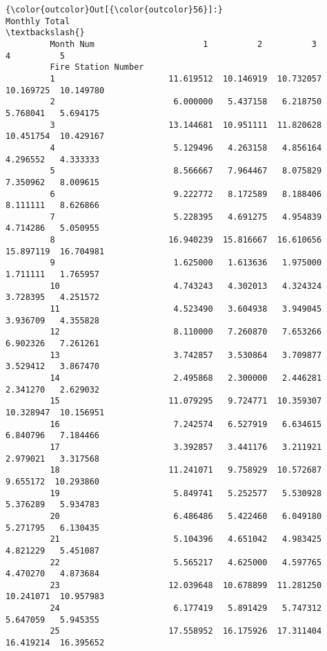 \documentclass[11pt]{article}
\begin{document}
\begin{Verbatim}[commandchars=\\\{\}]
{\color{outcolor}Out[{\color{outcolor}56}]:}                     Monthly Total                                              \textbackslash{}
         Month Num                      1          2          3          4          5    
         Fire Station Number                                                             
         1                       11.619512  10.146919  10.732057  10.169725  10.149780   
         2                        6.000000   5.437158   6.218750   5.768041   5.694175   
         3                       13.144681  10.951111  11.820628  10.451754  10.429167   
         4                        5.129496   4.263158   4.856164   4.296552   4.333333   
         5                        8.566667   7.964467   8.075829   7.350962   8.009615   
         6                        9.222772   8.172589   8.188406   8.111111   8.626866   
         7                        5.228395   4.691275   4.954839   4.714286   5.050955   
         8                       16.940239  15.816667  16.610656  15.897119  16.704981   
         9                        1.625000   1.613636   1.975000   1.711111   1.765957   
         10                       4.743243   4.302013   4.324324   3.728395   4.251572   
         11                       4.523490   3.604938   3.949045   3.936709   4.355828   
         12                       8.110000   7.260870   7.653266   6.902326   7.261261   
         13                       3.742857   3.530864   3.709877   3.529412   3.867470   
         14                       2.495868   2.300000   2.446281   2.341270   2.629032   
         15                      11.079295   9.724771  10.359307  10.328947  10.156951   
         16                       7.242574   6.527919   6.634615   6.840796   7.184466   
         17                       3.392857   3.441176   3.211921   2.979021   3.317568   
         18                      11.241071   9.758929  10.572687   9.655172  10.293860   
         19                       5.849741   5.252577   5.530928   5.376289   5.934783   
         20                       6.486486   5.422460   6.049180   5.271795   6.130435   
         21                       5.104396   4.651042   4.983425   4.821229   5.451087   
         22                       5.565217   4.625000   4.597765   4.470270   4.873684   
         23                      12.039648  10.678899  11.281250  10.241071  10.957983   
         24                       6.177419   5.891429   5.747312   5.647059   5.945355   
         25                      17.558952  16.175926  17.311404  16.419214  16.395652   

\end{Verbatim}
\end{document}
